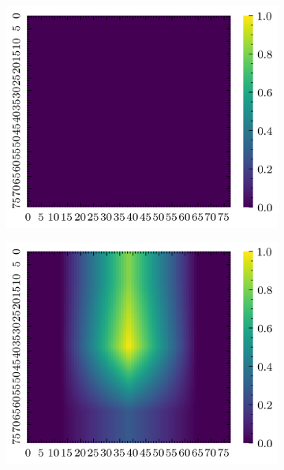 \begin{figure}[H]
    \begin{subfigure}[b]{0.19\textwidth}
        \includegraphics[width=\linewidth]{../img/5/quarry/best/grad-cam-2d-0.png}
    \end{subfigure}
    \begin{subfigure}[b]{0.19\textwidth}
        \includegraphics[width=\linewidth]{../img/5/quarry/best/grad-cam-2d-1.png}
    \end{subfigure}  
    \begin{subfigure}[b]{0.19\textwidth}

\end{subfigure}
\end{figure}

